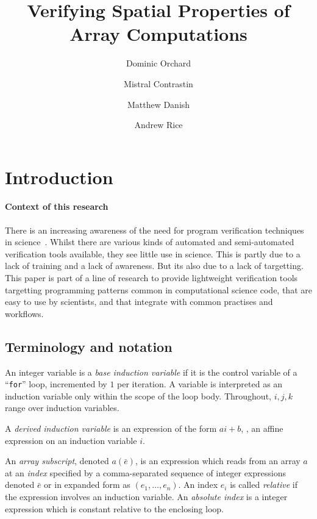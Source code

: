 \documentclass[acmlarge,review,anonymous]{acmart}\settopmatter{printfolios=true}
\title{Verifying Spatial Properties of Array Computations}
\author{Dominic Orchard}
\affiliation{
  \department{School of Computing}
  \institution{University of Kent}
}
\author{Mistral Contrastin}
\affiliation{
  \department{Computer Laboratory}
  \institution{University of Cambridge}
}
\author{Matthew Danish}
\affiliation{
  \department{Computer Laboratory}
  \institution{University of Cambridge}
}
\author{Andrew Rice}
\affiliation{
  \department{Computer Laboratory}
  \institution{University of Cambridge}
}
\theoremstyle{definition}
\theoremstyle{plain}
\begin{document}
\maketitle

\section{Introduction}

\paragraph{Context of this research}

There is an increasing awareness of the need for program verification
techniques in
science~\cite{post2005computational,oberkampf2010verification,orchard2014computational}.
Whilst there are various kinds of automated and semi-automated
verification tools available, they see little use in science. This is
partly due to a lack of training and a lack of awareness. But its also
due to a lack of targetting. This paper is part of a line of research
to provide lightweight verification tools targetting
programming patterns common in computational science code, 
that are easy to use by scientists, and that integrate with common
practises and workflows.


\subsection{Terminology and notation}

\begin{definition}
  An integer variable is a \emph{base induction variable} if it is the control
  variable of a ``\texttt{for}'' loop, incremented by $1$ per iteration. A variable
  is interpreted as an induction variable only within the scope of the loop
  body. Throughout, $i, j, k$ range over induction variables.

  A \emph{derived induction variable} is an expression of the form $a
  i + b$, \ie{}, an affine expression on an induction variable $i$.
\end{definition}

\begin{definition}
  An \emph{array subscript}, denoted $a(\bar{e})$, is an expression
  which reads from an array $a$ at an \emph{index} specified by a
  comma-separated sequence of integer expressions denoted $\bar{e}$ or
  in expanded form as $(e_1, \ldots, e_n)$. An index $e_i$ is called
  \emph{relative} if the expression involves an induction variable.
  An \emph{absolute index} is a integer expression which is constant
  relative to the enclosing loop.
\end{definition}
\end{document}
